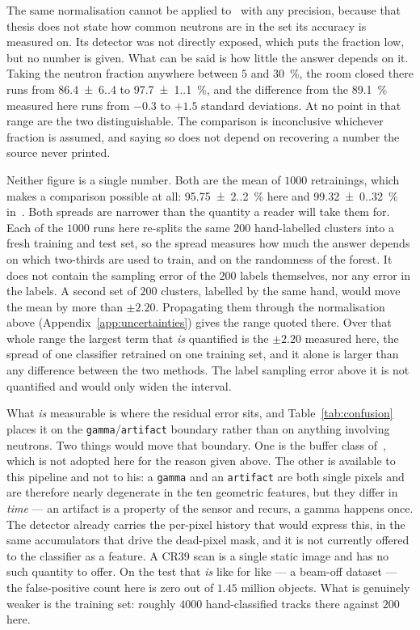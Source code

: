 \documentclass[a4paper,headsepline,oneside,11pt]{scrartcl}
\begin{document}
The same normalisation cannot be applied to~\cite{Filter2018} with any
precision, because that thesis does not state how common neutrons are in the set
its accuracy is measured on. Its detector was not directly exposed, which puts
the fraction low, but no number is given. What can be said is how little the
answer depends on it. Taking the neutron fraction anywhere between $5$ and
\SI{30}{\percent}, the room closed there runs from \num{86.4(6.4)} to
\SI{97.7(1.1)}{\percent}, and the difference from the \SI{89.1}{\percent} measured here runs
from $-0.3$ to $+1.5$ standard deviations. At no point in that range are the two
distinguishable. The comparison is inconclusive whichever fraction is assumed,
and saying so does not depend on recovering a number the source never printed.

Neither figure is a single number. Both are the mean of $1000$ retrainings,
which makes a comparison possible at all:
\SI{95.75(2.20)}{\percent} here and \SI{99.32(0.32)}{\percent}
in~\cite{Filter2018}. Both spreads are narrower than the quantity a reader
will take them for. Each of the $1000$ runs here re-splits the same $200$
hand-labelled clusters into a fresh training and test set, so the spread measures
how much the answer depends on which two-thirds are used to train, and on the
randomness of the forest. It does not contain the sampling error of the $200$
labels themselves, nor any error in the labels. A second set of $200$ clusters,
labelled by the same hand, would move the mean by more than $\pm 2.20$.
Propagating them through the normalisation above
(Appendix~\ref{app:uncertainties}) gives the range quoted there. Over
that whole range the largest term that \emph{is} quantified is the $\pm 2.20$
measured here, the spread of one classifier retrained on one training set, and
it alone is larger than any difference between the two methods. The label
sampling error above it is not quantified and would only widen the interval.

What \emph{is} measurable is where the residual error sits, and
Table~\ref{tab:confusion} places it on the \texttt{gamma}/\texttt{artifact}
boundary rather than on anything involving neutrons. Two things would move that
boundary. One is the buffer class of~\cite{Filter2018}, which is not adopted here
for the reason given above. The other is available to this pipeline and not to
his: a \texttt{gamma} and an \texttt{artifact} are both single pixels and are
therefore nearly degenerate in the ten geometric features, but they differ in
\emph{time} --- an artifact is a property of the sensor and recurs, a gamma
happens once. The detector already carries the per-pixel history that would
express this, in the same accumulators that drive the dead-pixel mask, and it is
not currently offered to the classifier as a feature. A CR39 scan is a single
static image and has no such quantity to offer. On the test that
\emph{is} like for like --- a beam-off dataset --- the false-positive count here
is zero out of $1.45$ million objects. What is genuinely weaker is the training
set: roughly $4000$ hand-classified tracks there against $200$ here.
\end{document}
